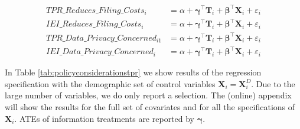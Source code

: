 \documentclass[11pt]{article}
\begin{document}
\begin{center}
\begin{align}
    \text{$TPR\_Reduces\_Filing\_Costs_i$} 
    &= \alpha + \boldsymbol{\gamma}^{\top}\mathbf{T}_i + \boldsymbol{\beta}^{\top}\mathbf{X}_{i} +  \varepsilon_{i} \\[0.25em]
    \text{$IEI\_Reduces\_Filing\_Costs_i$} 
    &= \alpha + \boldsymbol{\gamma}^{\top}\mathbf{T}_i + \boldsymbol{\beta}^{\top}\mathbf{X}_{i} +  \varepsilon_{i} \\[0.5em]
    \text{$TPR\_Data\_Privacy\_Concerned_{i1}$} 
    &= \alpha + \boldsymbol{\gamma}^{\top}\mathbf{T}_i + \boldsymbol{\beta}^{\top}\mathbf{X}_{i} + \varepsilon_{i} \\[0.25em]
    \label{eq:IEI_data_privacy_reduce}
    \text{$IEI\_Data\_Privacy\_Concerned_i$} 
    &= \alpha + \boldsymbol{\gamma}^{\top}\mathbf{T}_i + \boldsymbol{\beta}^{\top}\mathbf{X}_{i} + \varepsilon_{i} 
\end{align}
\end{center}

In Table \ref{tab:policyconsiderationstpr} we show results of the regression specification with the demographic set of control variables $\mathbf{X}_{i} = \mathbf{X}_{i}^{D}$. Due to the large number of variables, we do only report a selection. The (online) appendix will show the results for the full set of covariates and for all the specifications of $\mathbf{X}_{i}$. ATEs of information treatments are reported by $\boldsymbol{\gamma}$.
\end{document}
